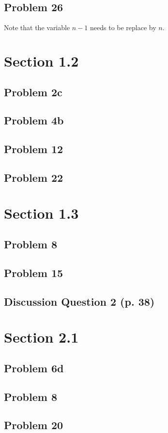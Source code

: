 \documentclass{article}
\begin{document}
\subsection*{Problem 26} 
Note that the variable $n-1$ needs to be replace by $n$.

\section*{Section 1.2}
\subsection*{Problem 2c}
\subsection*{Problem 4b}
\subsection*{Problem 12}
\subsection*{Problem 22}

\section*{Section 1.3}
\subsection*{Problem 8}
\subsection*{Problem 15}
\subsection*{Discussion Question 2 (p. 38)}

\section*{Section 2.1}
\subsection{Problem 6d}
\subsection{Problem 8}
\subsection{Problem 20}
\end{document}
